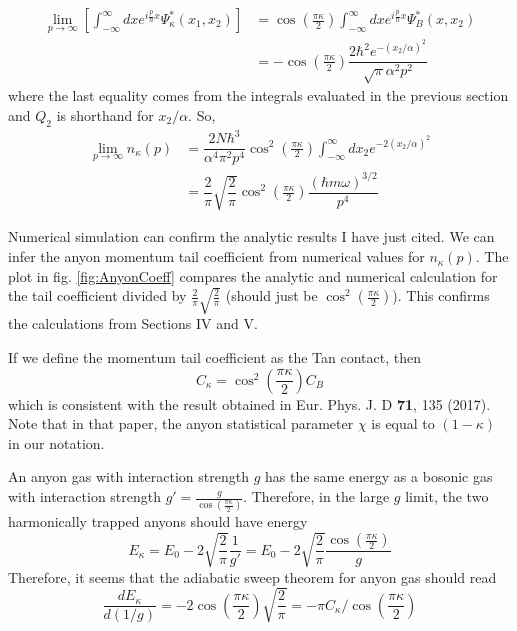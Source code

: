 \documentclass[onecolumn,english,aps,pra]{revtex4}
\begin{document}
\begin{align*}
\lim_{p \rightarrow \infty} \left[ \int_{-\infty}^{\infty} dx  e^{i \frac{p}{\hbar} x} \Psi_\kappa^*(x_{1},x_{2}) \right] & =  
\cos\left(\frac{\pi \kappa}{2}\right) \int_{-\infty}^{\infty} dx  e^{i \frac{p}{\hbar} x} \Psi_{B}^*(x, x_{2})\\
& = -\cos\left(\frac{\pi \kappa}{2}\right) \dfrac{2 \hbar^2 e^{-(x_{2}/\alpha)^{2}}}{\sqrt{\pi}\alpha^2 p^2}
\end{align*}
where the last equality comes from the integrals evaluated in the previous section and $Q_{2}$ is shorthand for $x_{2}/\alpha$. So,
\begin{align*}
\lim_{p \rightarrow \infty} n_\kappa (p) & = \dfrac{2 N \hbar^3}{\alpha^4 \pi^2 p^4} 
\cos^2\left(\frac{\pi \kappa}{2}\right)  \int_{-\infty}^{\infty} dx_{2}  e^{-2(x_{2}/\alpha)^{2}}\\
& = \dfrac{2}{\pi} \sqrt{\dfrac{2}{\pi}} \cos^2\left(\frac{\pi \kappa}{2}\right) \dfrac{(\hbar m \omega)^{3/2}}{p^4}
\end{align*}

Numerical simulation can confirm the analytic results I have just cited. We can infer the anyon momentum tail coefficient from numerical values for $n_{\kappa}(p)$.  The plot in fig. \ref{fig:AnyonCoeff} compares the analytic and numerical calculation for the tail coefficient divided by $ \frac{2}{\pi} \sqrt{\frac{2}{\pi}}$ (should just be $\cos^2\left(\frac{\pi \kappa}{2}\right)$). This confirms the calculations from Sections IV and V.

If we define the momentum tail coefficient as the Tan contact, then
\[
C_{\kappa} = \cos^2\left(\frac{\pi \kappa}{2}\right) C_{B}
\]
which is consistent with the result obtained in Eur. Phys. J. D \textbf{71}, 135 (2017). Note that in that paper, the anyon statistical parameter $\chi$ is equal to $(1 - \kappa)$ in our notation.

An anyon gas with interaction strength $g$ has the same energy as a bosonic gas with interaction strength $g' = \frac{g}{\cos\left(\frac{\pi \kappa}{2}\right)}$. Therefore, in the large $g$ limit, the two harmonically trapped anyons should have energy
\[
E_{\kappa} = E_{0} - 2\sqrt{\dfrac{2}{\pi}} \frac{1}{g'} 
= E_{0} - 2\sqrt{\dfrac{2}{\pi}} \frac{\cos\left(\frac{\pi \kappa}{2}\right)}{g}
\]
Therefore, it seems that the adiabatic sweep theorem for anyon gas should read
\[
\frac{dE_{\kappa}}{d(1/g)} = - 2 \cos\left(\frac{\pi \kappa}{2}\right) \sqrt{\frac{2}{\pi}} = -\pi C_{\kappa} / \cos\left(\frac{\pi \kappa}{2}\right)
\]
\end{document}
